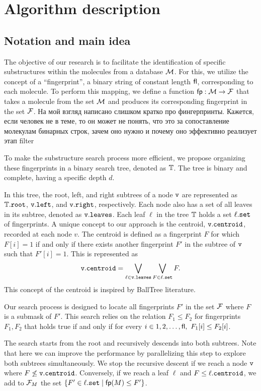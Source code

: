 \section{Algorithm description}

\subsection{Notation and main idea}
The objective of our research is to facilitate the identification of specific substructures within the molecules from a database $\mathcal{M}$. 
For this, we utilize the concept of a ``fingerprint'', a binary string of constant length ${\sf fl}$, corresponding to each molecule. 
To perform this mapping, we define a function ${\sf fp}: \mathcal{M} \to \mathcal{F}$ that takes a molecule from the set $\mathcal{M}$ and produces its 
corresponding fingerprint in the set $\mathcal{F}$. {\color{red} На мой взгляд написано слишком кратко про фингерпринты. Кажется, если 
человек не в теме, то он может не понять, что это за сопоставление молекулам бинарных строк, зачем оно нужно и почему оно эффективно реализует этап filter}

To make the substructure search process more efficient, we propose organizing these fingerprints in a binary search tree, denoted as $\mathbb{T}$. 
The tree is binary and complete, having a specific depth $d$.

In this tree, the root, left, and right subtrees of a node $\tt{v}$ are represented as $\mathbb{T}.\tt{root}$, $\tt{v.left}$, and $\tt{v.right}$, 
respectively. Each node also has a set of all leaves in its subtree, denoted as $\tt{v.leaves}$. Each leaf $\ell$ in the tree $\mathbb{T}$ holds 
a set $\ell.\tt{set}$ of fingerprints. A unique concept to our approach is the centroid, ${\tt v.centroid}$, recorded at each node $v$. 
The centroid is defined as a fingerprint $F$ for which $F[i] = 1$ if and only if there exists another fingerprint $F'$ in the subtree 
of $\tt{v}$ such that $F'[i] = 1$. This is represented as
$${\tt v.centroid} = \bigvee\limits_{\ell \in {\tt v.leaves}}\bigvee\limits_{F \in \ell.{\tt set}} F.$$ 
This concept of the centroid is inspired by BallTree literature.

Our search process is designed to locate all fingerprints $F'$ in the set $\mathcal{F}$ where $F$ is a submask of $F'$. This search relies on the relation $F_1 \le F_2$ for fingerprints $F_1, F_2$ that holds true if and only if for every $i \in {1, 2, \ldots, {\sf fl}}, \ F_1[i] \le F_2[i]$. 

The search starts from the root and recursively descends into both subtrees. Note that here we can improve the performance by parallelizing 
this step to explore both subtrees simultaneously. We stop the recursive descent if we reach a node ${\tt v}$ where $F \not\le {\tt v.centroid}$. 
Conversely, if we reach a leaf $\ell$ and $F \le \ell.{\tt centroid}$, we add to $\mathcal{F}_M$ the set $\{F' \in  \ell.{\tt set} \mid {\sf fp}(M) \le F'\}$.

